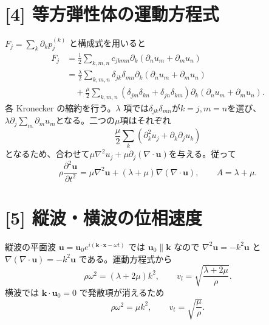 \documentclass[11pt,a4paper]{article}
\begin{document}
\section*{[4] 等方弾性体の運動方程式}
$F_j=\sum_k\partial_kp_j^{(k)}$ と構成式を用いると
\begin{align}
 F_j&=\frac12\sum_{k,m,n}c_{jkmn}\partial_k
                   (\partial_nu_m+\partial_mu_n)\\
 &=\frac{\lambda}{2}\sum_{k,m,n}
     \delta_{jk}\delta_{mn}\partial_k(\partial_nu_m+\partial_mu_n)\\
 &\quad+\frac{\mu}{2}\sum_{k,m,n}
    (\delta_{jm}\delta_{kn}+\delta_{jn}\delta_{km})
       \partial_k(\partial_nu_m+\partial_mu_n).
\end{align}
各 Kronecker の縮約を行う。$\lambda$ 項では$\delta_{jk}\delta_{mn}$が$k=j,m=n$を選び、$\lambda\partial_j\sum_m\partial_mu_m$となる。二つの$\mu$項はそれぞれ
\begin{equation}
 \frac\mu2\sum_k(\partial_k^2u_j+\partial_k\partial_ju_k)
\end{equation}
となるため、合わせて$\mu\nabla^2u_j+\mu\partial_j(\nabla\cdot\boldsymbol u)$を与える。従って
\begin{equation}
 \rho\frac{\partial^2\boldsymbol u}{\partial t^2}
 =\mu\nabla^2\boldsymbol u+(\lambda+\mu)\nabla(\nabla\cdot\boldsymbol u),
 \qquad \boxed{A=\lambda+\mu}.
\end{equation}

\section*{[5] 縦波・横波の位相速度}
縦波の平面波 $\boldsymbol u=\boldsymbol u_0e^{i(\boldsymbol k\cdot\boldsymbol x-\omega t)}$
では $\boldsymbol u_0\parallel\boldsymbol k$ なので
$\nabla^2\boldsymbol u=-k^2\boldsymbol u$ と
$\nabla(\nabla\cdot\boldsymbol u)=-k^2\boldsymbol u$ である。運動方程式から
\[
 \rho\omega^2=(\lambda+2\mu)k^2,
 \qquad \boxed{v_l=\sqrt{\frac{\lambda+2\mu}{\rho}}}.
\]
横波では $\boldsymbol k\cdot\boldsymbol u_0=0$ で発散項が消えるため
\[
 \rho\omega^2=\mu k^2,
 \qquad \boxed{v_t=\sqrt{\frac{\mu}{\rho}}}.
\]
\end{document}

